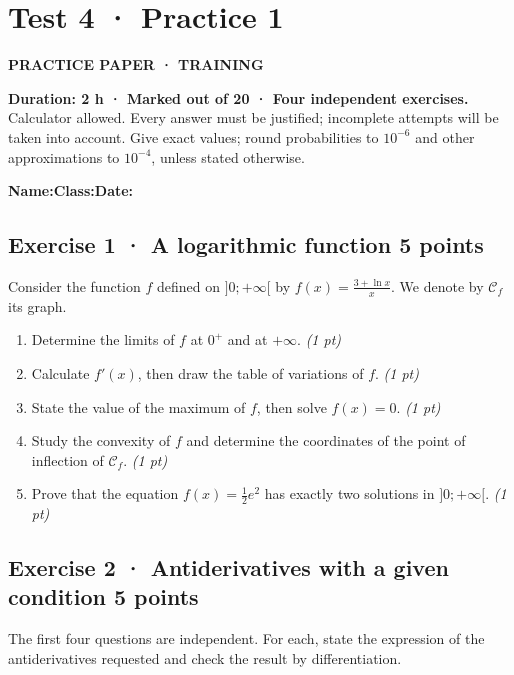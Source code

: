 \clearpage{}\label{sujet:6-1}

\section*{Test 4 · Practice 1}

{\sffamily\bfseries\color{teal}PRACTICE PAPER · TRAINING\par}

\textbf{Duration: 2 h · Marked out of 20 · Four independent exercises.}\\Calculator allowed. Every answer must be justified; incomplete attempts will be taken into account. Give exact values; round probabilities to $10^{-6}$ and other approximations to $10^{-4}$, unless stated otherwise.

\smallskip\textbf{Name:}\enspace\dotfill\quad\textbf{Class:}\enspace\dotfill\quad\textbf{Date:}\enspace\dotfill

\subsection*{Exercise 1 · A logarithmic function \hfill 5 points}Consider the function $f$ defined on $]0;+\infty[$ by $f(x)=\frac{3+\ln x}x$. We denote by $\mathcal C_f$ its graph.

\begin{enumerate}

\item Determine the limits of $f$ at $0^+$ and at $+\infty$. \hfill\textit{(1 pt)}

\item Calculate $f' (x)$, then draw the table of variations of $f$. \hfill\textit{(1 pt)}

\item State the value of the maximum of $f$, then solve $f(x)=0$. \hfill\textit{(1 pt)}

\item Study the convexity of $f$ and determine the coordinates of the point of inflection of $\mathcal C_f$. \hfill\textit{(1 pt)}

\item Prove that the equation $f(x)=\frac12 e^{2}$ has exactly two solutions in $]0;+\infty[$. \hfill\textit{(1 pt)}

\end{enumerate}

\subsection*{Exercise 2 · Antiderivatives with a given condition \hfill 5 points}The first four questions are independent. For each, state the expression of the antiderivatives requested and check the result by differentiation.

